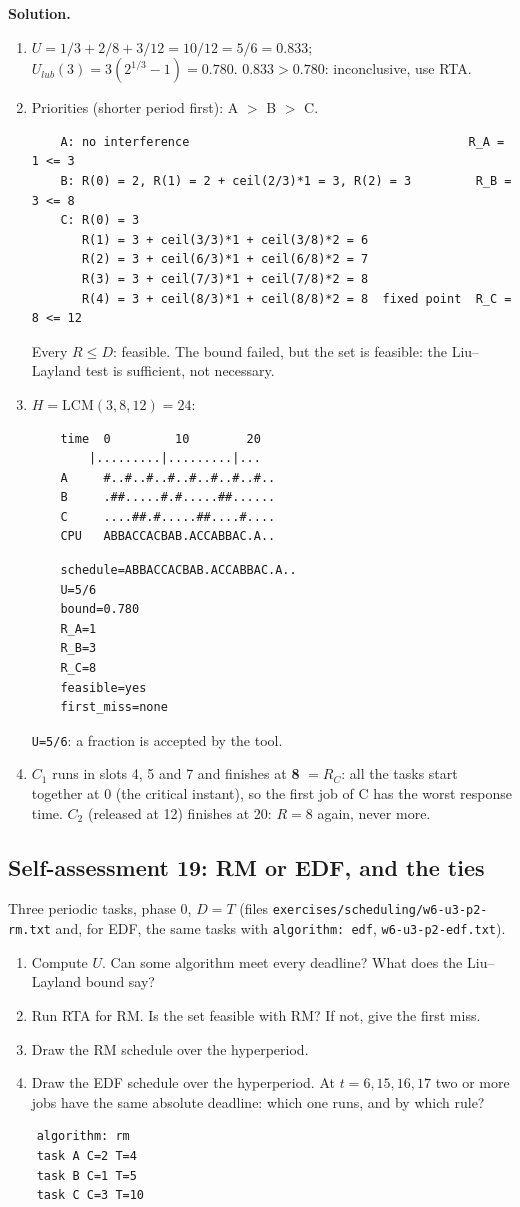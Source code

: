 \textbf{Solution.}
\begin{enumerate}
    \item $U = 1/3 + 2/8 + 3/12 = 10/12 = 5/6 = 0.833$; $U_{lub}(3) = 3 (2^{1/3} - 1) = 0.780$. $0.833 > 0.780$: inconclusive, use RTA.
    \item Priorities (shorter period first): A $>$ B $>$ C.
\begin{verbatim}
    A: no interference                                       R_A = 1 <= 3
    B: R(0) = 2, R(1) = 2 + ceil(2/3)*1 = 3, R(2) = 3         R_B = 3 <= 8
    C: R(0) = 3
       R(1) = 3 + ceil(3/3)*1 + ceil(3/8)*2 = 6
       R(2) = 3 + ceil(6/3)*1 + ceil(6/8)*2 = 7
       R(3) = 3 + ceil(7/3)*1 + ceil(7/8)*2 = 8
       R(4) = 3 + ceil(8/3)*1 + ceil(8/8)*2 = 8  fixed point  R_C = 8 <= 12
\end{verbatim}
    Every $R \le D$: feasible. The bound failed, but the set is feasible: the Liu--Layland test is sufficient, not necessary.
    \item $H = \mathrm{LCM}(3, 8, 12) = 24$:
\begin{verbatim}
    time  0         10        20
        |.........|.........|...
    A     #..#..#..#..#..#..#..#..
    B     .##.....#.#.....##......
    C     ....##.#.....##....#....
    CPU   ABBACCACBAB.ACCABBAC.A..
\end{verbatim}
\begin{verbatim}
    schedule=ABBACCACBAB.ACCABBAC.A..
    U=5/6
    bound=0.780
    R_A=1
    R_B=3
    R_C=8
    feasible=yes
    first_miss=none
\end{verbatim}
    \texttt{U=5/6}: a fraction is accepted by the tool.
    \item $C_1$ runs in slots 4, 5 and 7 and finishes at \textbf{8} $= R_C$: all the tasks start together at 0 (the critical instant), so the first job of C has the worst response time. $C_2$ (released at 12) finishes at 20: $R = 8$ again, never more.
\end{enumerate}

\subsection*{Self-assessment 19: RM or EDF, and the ties}
Three periodic tasks, phase 0, $D = T$ (files \texttt{exercises/scheduling/w6-u3-p2-rm.txt} and, for EDF, the same tasks with \texttt{algorithm: edf}, \texttt{w6-u3-p2-edf.txt}).
\begin{enumerate}
    \item Compute $U$. Can some algorithm meet every deadline? What does the Liu--Layland bound say?
    \item Run RTA for RM. Is the set feasible with RM? If not, give the first miss.
    \item Draw the RM schedule over the hyperperiod.
    \item Draw the EDF schedule over the hyperperiod. At $t = 6, 15, 16, 17$ two or more jobs have the same absolute deadline: which one runs, and by which rule?
\end{enumerate}
\begin{lstlisting}
    algorithm: rm
    task A C=2 T=4
    task B C=1 T=5
    task C C=3 T=10
\end{lstlisting}

